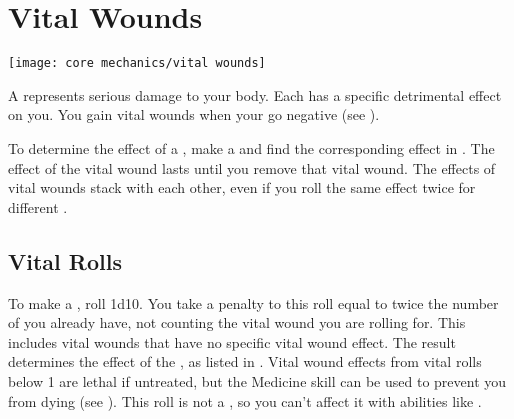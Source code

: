 \section{Vital Wounds}\label{Vital Wounds}
    \texttt{[image: core mechanics/vital wounds]}

    A  represents serious damage to your body.
    Each  has a specific detrimental effect on you.
    You gain vital wounds when your  go negative (see ).

    To determine the effect of a , make a  and find the corresponding effect in .
    The effect of the vital wound lasts until you remove that vital wound.
    The effects of vital wounds stack with each other, even if you roll the same effect twice for different .

    \subsection{Vital Rolls}\label{Vital Rolls}
        To make a , roll 1d10.
        You take a penalty to this roll equal to twice the number of  you already have, not counting the vital wound you are rolling for.
        This includes vital wounds that have no specific vital wound effect.
        The result determines the effect of the , as listed in .
        Vital wound effects from vital rolls below 1 are lethal if untreated, but the Medicine skill can be used to prevent you from dying (see ).
        This roll is not a , so you can't affect it with abilities like .

